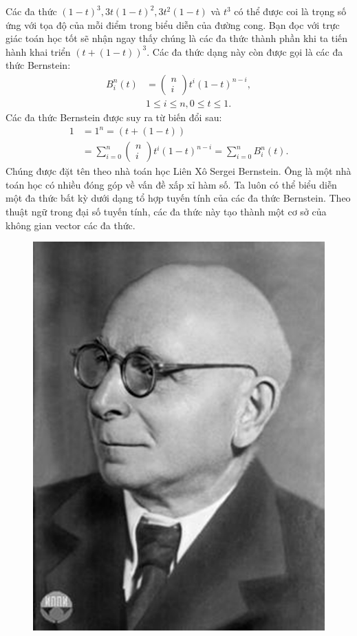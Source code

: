 \begin{multicols}{2}
	Các đa thức $(1-t)^3,3t(1-t)^2,3t^2 (1-t)$ và $t^3$ có thể được coi là trọng số ứng với tọa độ của mỗi điểm trong biểu diễn của đường cong. Bạn đọc với trực giác toán học tốt sẽ nhận ngay thấy chúng là các đa thức thành phần khi ta tiến hành khai triển $\left(t+(1-t)\right)^3$.
	\vskip 0.1cm
	Các đa thức dạng này còn được gọi là các đa thức Bernstein:
	\begin{align*}
		B_i^n (t)&= \left(\!\!\begin{array}{l}
			n\\
			i
		\end{array}\!\!\right)t^i (1-t)^{n-i},\\
	&1 \le i \le n,0 \le t \le 1.
	\end{align*}
	Các đa thức Bernstein được suy ra từ biến đổi sau:
	\begin{align*}
		1 &= 1^n = \left(t + (1-t)\right) \\
		&= \sum\limits_{i = 0}^n {\left( \begin{array}{l}
				n\\
				i
			\end{array} \right){t^i}{{(1 - t)}^{n - i}} = } \sum\limits_{i = 0}^n {B_i^n(t).}
	\end{align*}
	Chúng được đặt tên theo nhà toán học Liên Xô Sergei Bernstein. Ông là một nhà toán học có nhiều đóng góp về vấn đề xấp xỉ hàm số. Ta luôn có thể biểu diễn một đa thức bất kỳ dưới dạng tổ hợp tuyến tính của các đa thức Bernstein. Theo thuật ngữ trong đại số tuyến tính, các đa thức này tạo thành một cơ sở của không gian vector các đa thức.
	\begin{figure}[H]
		\vspace*{-5pt}
		\centering
		\captionsetup{labelformat= empty, justification=centering}
		\includegraphics[width= 0.6\linewidth]{7}

\end{figure}
\end{multicols}

